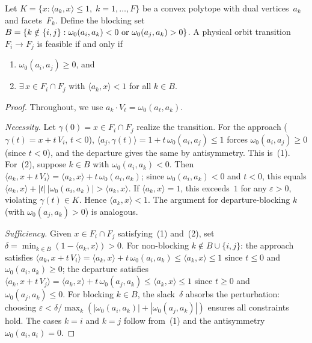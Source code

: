 \begin{unverified}
\begin{lemma}
\label{lem:transition-feasibility}
Let $K = \{x : \langle a_k, x \rangle \le 1,\; k = 1, \ldots, F\}$
be a convex polytope with dual vertices~$a_k$ and facets~$F_k$.
Define the blocking set
$B = \{k \notin \{i,j\} : \omega_0(a_i, a_k) < 0
  \textup{ or } \omega_0(a_j, a_k) > 0\}$.
A physical orbit transition $F_i \to F_j$ is feasible if and only if
\begin{enumerate}
  \item $\omega_0(a_i, a_j) \ge 0$, and
  \item $\exists\, x \in F_i \cap F_j$ with
    $\langle a_k, x \rangle < 1$ for all $k \in B$.
\end{enumerate}
\end{lemma}

\begin{proof}
Throughout, we use $a_k \cdot V_\ell = \omega_0(a_\ell, a_k)$.

\emph{Necessity.}
Let $\gamma(0) = x \in F_i \cap F_j$ realize the transition.
For the approach ($\gamma(t) = x + t\, V_i$, $t < 0$),
$\langle a_j, \gamma(t) \rangle = 1 + t\, \omega_0(a_i, a_j) \le 1$
forces $\omega_0(a_i, a_j) \ge 0$ (since $t < 0$),
and the departure gives the same by antisymmetry. This is~(1).
For~(2), suppose $k \in B$ with $\omega_0(a_i, a_k) < 0$.
Then $\langle a_k, x + t\, V_i \rangle = \langle a_k, x \rangle + t\,\omega_0(a_i, a_k)$;
since $\omega_0(a_i, a_k) < 0$ and $t < 0$, this equals
$\langle a_k, x \rangle + |t|\,|\omega_0(a_i, a_k)| > \langle a_k, x \rangle$.
If $\langle a_k, x \rangle = 1$, this exceeds~$1$ for any $\varepsilon > 0$,
violating $\gamma(t) \in K$.
Hence $\langle a_k, x \rangle < 1$.
The argument for departure-blocking $k$ (with $\omega_0(a_j, a_k) > 0$)
is analogous.

\emph{Sufficiency.}
Given $x \in F_i \cap F_j$ satisfying~(1) and~(2),
set $\delta = \min_{k \in B} (1 - \langle a_k, x \rangle) > 0$.
For non-blocking $k \notin B \cup \{i,j\}$:
the approach satisfies
$\langle a_k, x + t\, V_i \rangle = \langle a_k, x \rangle + t\,\omega_0(a_i, a_k) \le \langle a_k, x \rangle \le 1$
since $t \le 0$ and $\omega_0(a_i, a_k) \ge 0$;
the departure satisfies
$\langle a_k, x + t\, V_j \rangle = \langle a_k, x \rangle + t\,\omega_0(a_j, a_k) \le \langle a_k, x \rangle \le 1$
since $t \ge 0$ and $\omega_0(a_j, a_k) \le 0$.
For blocking $k \in B$, the slack~$\delta$ absorbs the perturbation:
choosing $\varepsilon < \delta / \max_k(|\omega_0(a_i, a_k)| + |\omega_0(a_j, a_k)|)$
ensures all constraints hold.
The cases $k = i$ and $k = j$ follow from~(1) and
the antisymmetry $\omega_0(a_i, a_i) = 0$.
\end{proof}
\end{unverified}

